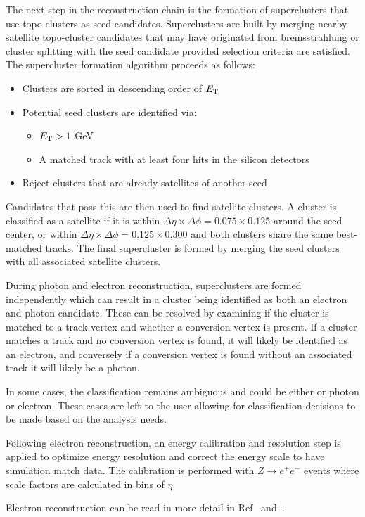 The next step in the reconstruction chain is the formation of superclusters that use topo-clusters as seed candidates. Superclusters are built by merging nearby satellite topo-cluster candidates that may have originated from bremsstrahlung or cluster splitting with the seed candidate provided selection criteria are satisfied. The supercluster formation algorithm proceeds as follows:
\begin{itemize}
  \item Clusters are sorted in descending order of $E_{\mathrm{T}}$
  \item Potential seed clusters are identified via:
  \begin{itemize}
    \item $E_{\mathrm{T}} > 1$ GeV
    \item A matched track with at least four hits in the silicon detectors
  \end{itemize}
  \item Reject clusters that are already satellites of another seed
\end{itemize}
Candidates that pass this are then used to find satellite clusters. A cluster is classified as a satellite if it is within $\Delta\eta \times \Delta\phi = 0.075 \times 0.125$ around the seed center, or within $\Delta\eta \times \Delta\phi = 0.125 \times 0.300$ and both clusters share the same best-matched tracks. The final supercluster is formed by merging the seed clusters with all associated satellite clusters.

During photon and electron reconstruction, superclusters are formed independently which can result in a cluster being identified as both an electron and photon candidate. These can be resolved by examining if the cluster is matched to a track vertex and whether a conversion vertex is present. If a cluster matches a track and no conversion vertex is found, it will likely be identified as an electron, and conversely if a conversion vertex is found without an associated track it will likely be a photon. 

In some cases, the classification remains ambiguous and could be either or photon or electron. These cases are left to the user allowing for classification decisions to be made based on the analysis needs.

Following electron reconstruction, an energy calibration and resolution step is applied to optimize energy resolution and correct the energy scale to have simulation match data. The calibration is performed with $Z\rightarrow e^{+}e^{-}$ events where scale factors are calculated in bins of $\eta$.

Electron reconstruction can be read in more detail in Ref~\cite{ATLAS:2019qmc} and~\cite{ATLAS:2019jvq}.
